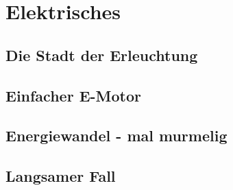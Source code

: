 \newpage
\chapter{Elektrisches}

\section{Die Stadt der Erleuchtung}

\section{Einfacher E-Motor}

\section{Energiewandel - mal murmelig}

\section{Langsamer Fall}
